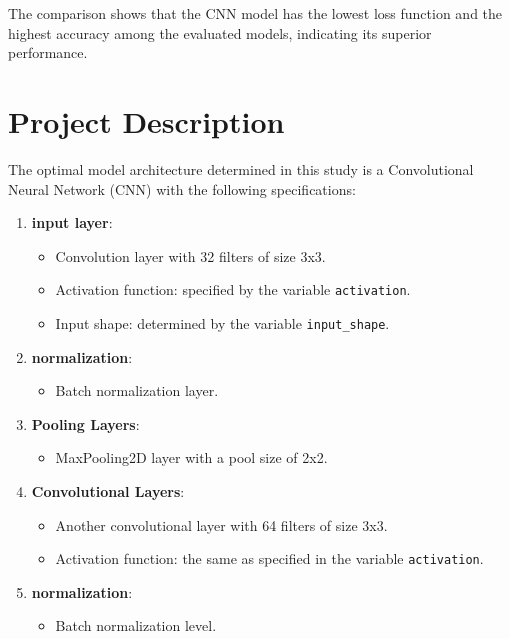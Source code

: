 \documentclass{article}
\begin{document}
The comparison shows that the CNN model has the lowest loss function and the highest accuracy among the evaluated models, indicating its superior performance.

\newpage

\section{Project Description}

The optimal model architecture determined in this study is a Convolutional Neural Network (CNN) with the following specifications:

\begin{enumerate}
    \item \textbf{input layer}:
          \begin{itemize}
              \item Convolution layer with 32 filters of size 3x3.
              \item Activation function: specified by the variable \texttt{activation}.
              \item Input shape: determined by the variable \texttt{input\_shape}.
          \end{itemize}

    \item \textbf{normalization}:
          \begin{itemize}
              \item Batch normalization layer.
          \end{itemize}

    \item \textbf{Pooling Layers}:
          \begin{itemize}
              \item MaxPooling2D layer with a pool size of 2x2.
          \end{itemize}

    \item \textbf{Convolutional Layers}:
          \begin{itemize}
              \item Another convolutional layer with 64 filters of size 3x3.
              \item Activation function: the same as specified in the variable \texttt{activation}.
          \end{itemize}

    \item \textbf{normalization}:
          \begin{itemize}
              \item Batch normalization level.
          \end{itemize}


\end{enumerate}
\end{document}

